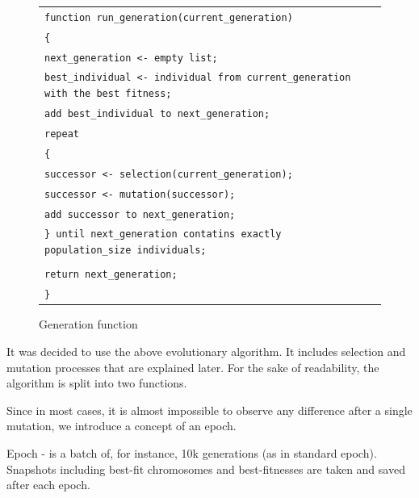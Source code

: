 \documentclass[letterpaper, 16pt]{article}
\newcommand{\vbreak}{\vspace{4mm}}
\newcommand{\tab}{\hspace{6mm}}
\begin{document}
\begin{figure}[H]
    \begin{flushleft}
        \begin{tabular}{l l}
            \texttt{function run\_generation(current\_generation)} & \\
            \texttt{\{} & \\
            \texttt{\tab next\_generation <- empty list;} & \\
            \texttt{\tab best\_individual <- individual from current\_generation with the best fitness;} & \\
            \texttt{\tab add best\_individual to next\_generation;} & \\
            \texttt{\tab repeat} & \\
            \texttt{\tab \{} & \\
            \texttt{\tab\tab successor <- selection(current\_generation);} & \\
            \texttt{\tab\tab successor <- mutation(successor);} & \\
            \texttt{\tab\tab add successor to next\_generation;} & \\
            \texttt{\tab \} until next\_generation contatins exactly population\_size individuals;} & \\
            \texttt{} & \\
            \texttt{\tab return next\_generation;} & \\
            \texttt{\}} & \\
        \end{tabular}
    \end{flushleft}
    \caption{Generation function}
    \label{run-generation}
\end{figure}

It was decided to use the above evolutionary algorithm. It includes selection and mutation processes that are explained later. For the sake of readability, the algorithm is split into two functions.

\vbreak

Since in most cases, it is almost impossible to observe any difference after a single mutation, we introduce a concept of an epoch. 

\vbreak

Epoch - is a batch of, for instance, 10k generations (as in standard epoch). Snapshots including best-fit chromosomes and best-fitnesses are taken and saved after each epoch.
\end{document}
